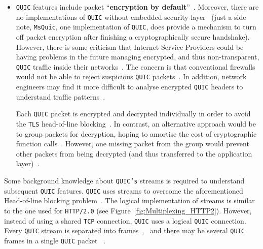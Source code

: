 \documentclass[12pt,a4paper]{report}
\begin{document}
\begin{itemize}
 
  \item \texttt{QUIC} features include packet \enquote{\textbf{encryption by default}}~\cite{the-road-to-quic}.
  Moreover, there are no implementations of \texttt{QUIC} without embedded security layer~\cite{head-of-line-blocking-in-quic-and-http-3-the-details}
  (just a side note, \texttt{MsQuic}, one implementation of \texttt{QUIC}, does provide a mechanism to turn off packet encryption after finishing a cryptographically secure handshake).
  However, there is some criticism that Internet Service Providers could be having problems in the future managing encrypted, and thus non-transparent, \texttt{QUIC} traffic inside their networks~\cite{why-is-googles-quic-leaving-network-operators-in-the-dark}.
  The concern is that conventional firewalls would not be able to reject suspicious \texttt{QUIC} packets~\cite{quic-the-internet-transport-protocol-based-on-udp}.
  In addition, network engineers may find it more difficult to analyse encrypted \texttt{QUIC} headers to understand traffic patterns~\cite{2017-12-18-transport-header-encryption}.
  
  Each \texttt{QUIC} packet is encrypted and decrypted individually in order to avoid the \texttt{TLS} head-of-line blocking~\cite{head-of-line-blocking-in-quic-and-http-3-the-details}.
  In contrast, an alternative approach would be to group packets for decryption, hoping to amortise the cost of cryptographic function calls~\cite{head-of-line-blocking-in-quic-and-http-3-the-details, optimizing-tls-record-size-and-buffering-latency}.
  However, one missing packet from the group would prevent other packets from being decrypted (and thus transferred to the application layer)~\cite{head-of-line-blocking-in-quic-and-http-3-the-details}.


  
  \end{itemize}
  Some background knowledge about \texttt{QUIC's} streams is required to understand subsequent \texttt{QUIC} features.
  \texttt{QUIC} uses streams to overcome the aforementioned Head-of-line blocking problem~\cite{UnderstandQUIC}.
  The logical implementation of streams is similar to the one used for \texttt{HTTP/2.0} (see Figure~\ref{fig:Multiplexing_HTTP2}).
  However, instead of using a shared \texttt{TCP} connection, \texttt{QUIC} uses a logical \texttt{QUIC} connection.
  Every \texttt{QUIC} stream is separated into frames~\cite{UnderstandQUIC},~\cite[Chapter~2.1]{ ietf-quic-transport-draft-32} and there may be several \texttt{QUIC} frames in a single \texttt{QUIC} packet ~\cite[Chapter~1]{ ietf-quic-transport-draft-32}.
\end{document}
